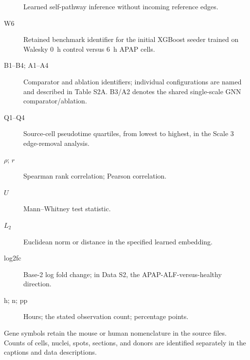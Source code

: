 \begin{description}
\item[\SelfOnly{}] Learned self-pathway inference without incoming reference edges.
\item[W6] Retained benchmark identifier for the initial XGBoost seeder trained on Walesky 0~h control versus 6~h APAP cells.
\item[B1--B4; A1--A4] Comparator and ablation identifiers; individual configurations are named and described in Table S2A. B3/A2 denotes the shared single-scale GNN comparator/ablation.
\item[Q1--Q4] Source-cell pseudotime quartiles, from lowest to highest, in the Scale 3 edge-removal analysis.
\item[\(\rho\); \(r\)] Spearman rank correlation; Pearson correlation.
\item[\(U\)] Mann--Whitney test statistic.
\item[\(L_2\)] Euclidean norm or distance in the specified learned embedding.
\item[log2fc] Base-2 log fold change; in Data S2, the APAP-ALF-versus-healthy direction.
\item[h; n; pp] Hours; the stated observation count; percentage points.
\end{description}
\noindent Gene symbols retain the mouse or human nomenclature in the source files. Counts of cells, nuclei, spots, sections, and donors are identified separately in the captions and data descriptions.
